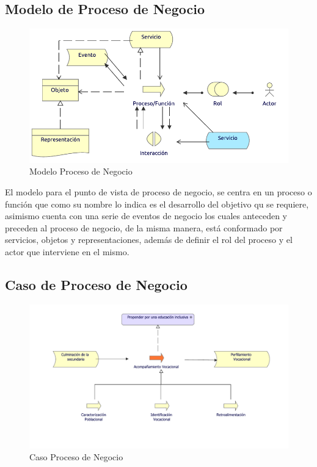 \subsection{Modelo de Proceso de Negocio}
\begin{figure}[h!]
	\centering
	\includegraphics[width=.8\linewidth]{imgs/modelo/ProcesoNegocio}
	\caption{Modelo Proceso de Negocio}
\end{figure}

El modelo para el punto de vista de proceso de negocio, se centra en un proceso o función que como su nombre lo indica es el desarrollo del objetivo qu se requiere, asimismo cuenta con una serie de eventos de negocio los cuales anteceden y preceden al proceso de negocio, de la misma manera, está conformado por servicios, objetos y representaciones, además de definir el rol del proceso y el actor que interviene en el mismo.

\clearpage
\subsection{Caso  de Proceso de Negocio}
\begin{figure}[h!]
	\centering
	\includegraphics[width=.9\linewidth]{imgs/caso/negocio/ProcesoNegocio}
	\caption{Caso Proceso de Negocio}
\end{figure}

